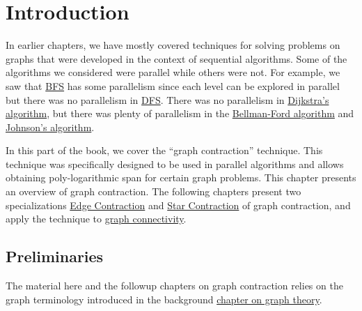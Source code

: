 \chapter{Introduction}
\label{ch:graphcon::intro}


\begin{preamble}[Overview]
\label{graphcon::intro::motivate}
In earlier chapters, we have mostly covered techniques for solving
problems on graphs that were developed in the context of sequential
algorithms.  
%
Some of the algorithms we considered were parallel while others were
not.  For example, we saw that 
%
\href{ch:graphs::bfs}{BFS}
%
has some parallelism since each
level can be explored in parallel 
%
but there was no parallelism in
%
\href{ch:graphs::dfs}{DFS}.
%
There was no parallelism in
%
\href{ch:shortest-paths:dijkstra}{Dijkstra's algorithm},
%
but there was plenty of parallelism in the 
\href{ch:shortest-paths::bellman-ford}{Bellman-Ford algorithm}
and
\href{ch:shortest-paths::johnson}{Johnson's algorithm}.

In this part of the book, we cover the ``graph contraction'' technique.
%
This technique was specifically designed to be used in parallel
algorithms and allows obtaining poly-logarithmic span for certain
graph problems.
%
This chapter presents an overview of graph contraction.
%
The following chapters present two specializations
%
\href{ch:graphcon::edge}{Edge Contraction}
%
and
%
\href{ch:graphcon::star}{Star Contraction} of graph contraction,
%
and apply the technique to
%
\href{ch:graphcon::connect}{graph connectivity}.
% 
\end{preamble}



\section{Preliminaries}
\label{sec:graphcon::intro::prelim}


\begin{note}
\label{graphcon::intro::prelim::terminology}
The material here and the followup chapters on graph contraction relies on the graph terminology introduced in the background
%
\href{ch:bg::graphs}{chapter on graph theory}.
%
\end{note}


